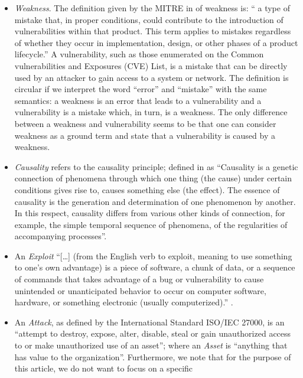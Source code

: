 \documentclass[conference]{IEEEtran}
\begin{document}
\begin{itemize}
	\item \emph{Weakness}. The definition given by the MITRE in
		\autocite{MITRE2020CWEweakness} of weakness is: `` a type of
		mistake that, in proper conditions, could contribute to the
		introduction of vulnerabilities within that product. This term
		applies to mistakes regardless of whether they occur in
		implementation, design, or other phases of a product
		lifecycle.'' A vulnerability, such as those enumerated on the
		Common vulnerabilities and Exposures (CVE) List, is a mistake
		that can be directly used by an attacker to gain access to a
		system or network.  The definition is circular if we interpret
		the word ``error'' and ``mistake'' with the same semantics: a
		weakness is an error that leads to a vulnerability and a
		vulnerability is a mistake which, in turn, is a weakness. The
		only difference between a weakness and vulnerability seems to
		be that one can consider weakness as a ground term and state
		that a vulnerability is caused by a weakness.
	\item \emph{Causality} refers to the causality principle; defined
		in \autocite{Spirkin1983Dialectical} as ``Causality is a genetic
		connection of phenomena through which one thing (the cause)
		under certain conditions gives rise to, causes something else
		(the effect). The essence of causality is the generation and
		determination of one phenomenon by another. In this respect,
		causality differs from various other kinds of connection, for
		example, the simple temporal sequence of phenomena, of the
		regularities of accompanying processes''. 
	\item An \emph{Exploit} ``[\ldots]
		(from the English verb to exploit, meaning to use something to
		one’s own advantage) is a piece of software, a chunk of data,
		or a sequence of commands that takes advantage of a bug or
		vulnerability to cause unintended or unanticipated behavior to
		occur on computer software, hardware, or something electronic
		(usually computerized).'' \autocite{wiki-exploit}.
	\item An \emph{Attack}, as defined by the International Standard
		ISO/IEC 27000, is an ``attempt to destroy, expose, alter,
		disable, steal or gain unauthorized access to or make
		unauthorized use of an asset''; where an \emph{Asset} is
		``anything that has value to the organization''. Furthermore, we note that for
		the purpose of this article, we do not want to focus on a specific

\end{itemize}
\end{document}
